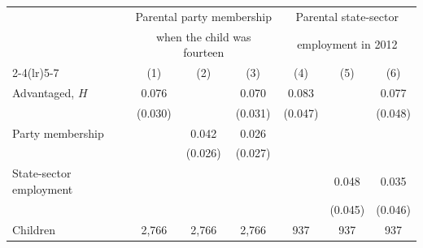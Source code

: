 \setlength{\tabcolsep}{6pt}
\begin{tabular}{@{}lcccccc@{}}
\toprule
& \multicolumn{3}{c}{Parental party membership} & \multicolumn{3}{c}{Parental state-sector} \\
& \multicolumn{3}{c}{when the child was fourteen} & \multicolumn{3}{c}{employment in 2012} \\
\cmidrule(lr){2-4}\cmidrule(lr){5-7}
& (1) & (2) & (3) & (4) & (5) & (6) \\
\midrule
Advantaged, $H$ & 0.076\rlap{***} &  & 0.070\rlap{**} & 0.083\rlap{*} &  & 0.077 \\
 & (0.030) &  & (0.031) & (0.047) &  & (0.048) \\
Party membership &  & 0.042 & 0.026 &  &  &  \\
 &  & (0.026) & (0.027) &  &  &  \\
State-sector employment &  &  &  &  & 0.048 & 0.035 \\
 &  &  &  &  & (0.045) & (0.046) \\
\addlinespace
Children & 2,766 & 2,766 & 2,766 & 937 & 937 & 937 \\
\bottomrule
\end{tabular}
